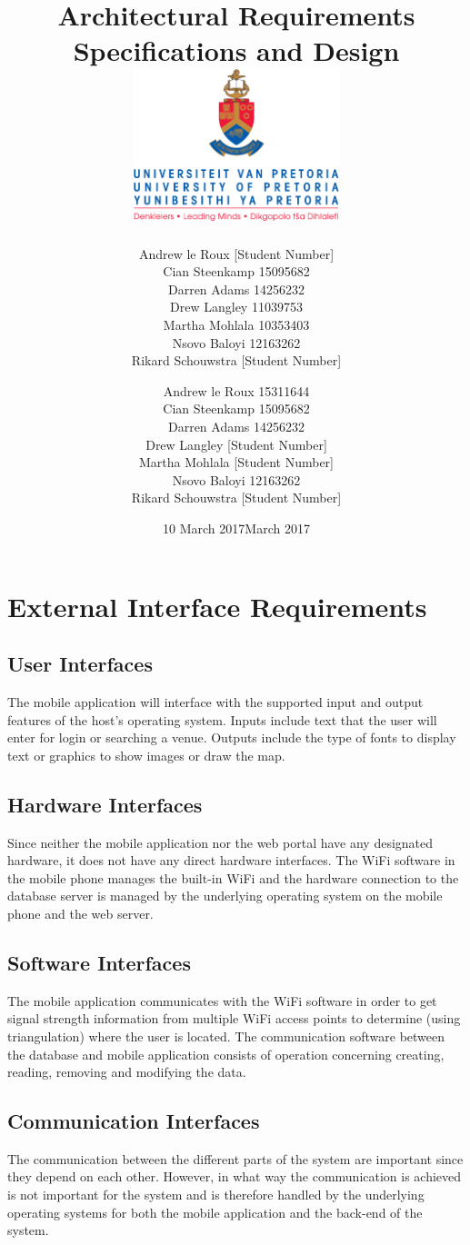 \documentclass{article}
\title{ Architectural Requirements Specifications and Design \\[0.5cm] \includegraphics[width=6cm]{front-page}}
\author{Andrew le Roux \hfill [Student Number] \\ Cian Steenkamp \hfill 15095682 \\ Darren Adams \hfill 14256232 \\ Drew Langley \hfill 11039753 \\ Martha Mohlala \hfill 10353403\\ Nsovo Baloyi \hfill 12163262 \\ Rikard Schouwstra \hfill [Student Number]}
\date{10 March 2017}
\author{Andrew le Roux \hfill 15311644 \\ Cian Steenkamp \hfill 15095682 \\ Darren Adams \hfill 14256232 \\ Drew Langley \hfill [Student Number] \\ Martha Mohlala \hfill [Student Number] \\ Nsovo Baloyi \hfill 12163262 \\ Rikard Schouwstra \hfill [Student Number]}
\date{March 2017}
\begin{document}
\maketitle
\pagebreak
\tableofcontents
\pagebreak

\section{External Interface Requirements}
    \subsection{User Interfaces}
        The mobile application will interface with the supported input and output
        features of the host's operating system. Inputs include text that the user
        will enter for login or searching a venue. Outputs include the type of fonts
        to display text or graphics to show images or draw the map.

    \subsection{Hardware Interfaces}
        Since neither the mobile application nor the web portal have any designated
        hardware, it does not have any direct hardware interfaces. The WiFi software
        in the mobile phone manages the built-in WiFi and the hardware connection
        to the database server is managed by the underlying operating system on the
        mobile phone and the web server.

    \subsection{Software Interfaces}
        The mobile application communicates with the WiFi software in order to get
        signal strength information from multiple WiFi access points to determine
        (using triangulation) where the user is located. The communication software
        between the database and mobile application consists of operation concerning
        creating, reading, removing and modifying the data.

    \subsection{Communication Interfaces}
        The communication between the different parts of the system are important since they depend on each other. However, in what way the communication is achieved is not important for the system and is therefore handled by the underlying operating systems for both the mobile application and the back-end of the system.
\end{document}
